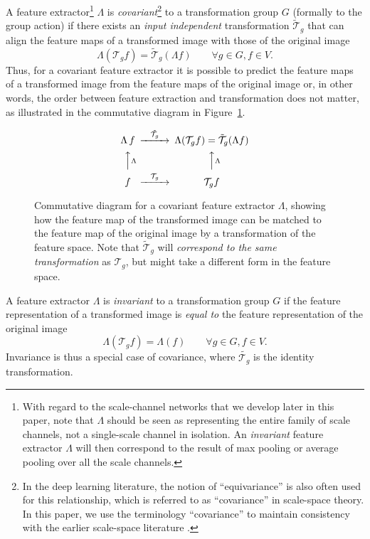 \documentclass[twocolumn,runningheads]{svjour3}
\def\calT{\mathcal{T}}
\begin{document}
A feature extractor\footnote{With regard to the scale-channel networks
  that we develop later in this paper, note that $\Lambda$ should be seen as representing the entire family
of scale channels, not a
single-scale channel in isolation. An {\em invariant\/} feature
extractor $\Lambda$ will then correspond to the result of
max pooling or average pooling over all the scale channels.}
$\Lambda$ is {\em covariant\/}\footnote{In the deep learning literature, the notion of
  ``equivariance'' is also often used for this relationship, which is
  referred to as ``covariance'' in scale-space theory. In this paper,
  we use the terminology ``covariance'' to maintain consistency with
  the earlier scale-space literature \cite{Lin13-ImPhys}.}
to a transformation
group $G$ (formally to the group action) if there exists an
{\em input independent\/} transformation $\tilde{\calT}_g$ that can
align the feature maps of a transformed image with those of the
original image
\begin{equation}
\Lambda(\calT_g f) = \tilde{\calT}_g (\Lambda f) \quad\quad \forall g \in G, f \in V.
\label{eq-covariance}
\end{equation}
Thus, for a covariant feature extractor it is possible to predict the
feature maps of a transformed image from the feature maps of the
original image or, in other words, the order between feature extraction and transformation does not matter, as illustrated in the commutative diagram in 
Figure~\ref{fig-comm-diag}.

\begin{figure}[hbt]
  \[
    \begin{CD}
       {\Lambda} \, f @>{\tilde{\calT_g}}>> \Lambda(\calT_g f) = \tilde{\calT}_g (\Lambda f) \\
       \Big\uparrow\vcenter{\rlap{$\scriptstyle{{\Lambda}}$}} & & \Big\uparrow\vcenter{\rlap{$\scriptstyle{{\Lambda}}$}} \\
       f @>{\calT_g}>> {\calT_g f} 
    \end{CD}
 \]
 \caption{Commutative diagram for a covariant feature extractor
  $\Lambda$, showing how the feature map of the transformed image can be matched to the feature map of the original image by a transformation of the feature space. Note that $\tilde{\calT}_g$ will \emph{correspond to the same transformation} as $\calT_g$, but might take a different form in the feature space.
}
\label{fig-comm-diag}
\end{figure}


A feature extractor $\Lambda$ is {\em invariant\/} to a transformation group $G$ if the feature representation of a transformed image is \emph{equal to} the feature representation of the original image 
\begin{equation}
\Lambda (\calT_g f) = \Lambda (f)  \quad\quad \forall g \in G, f \in V.
\label{eq-invariance}
\end{equation} 
Invariance is thus a special case of covariance, where $\tilde{\calT_g}$ is the identity transformation. 
\end{document}
